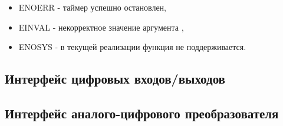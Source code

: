 {\itshape
\begin{itemize}
\item ENOERR - таймер успешно остановлен,
\item EINVAL - некорректное значение аргумента ,
\item ENOSYS - в текущей реализации функция не поддерживается.
\end{itemize}
}

\subsection{Интерфейс цифровых входов/выходов}
\subsection{Интерфейс аналого-цифрового преобразователя}


